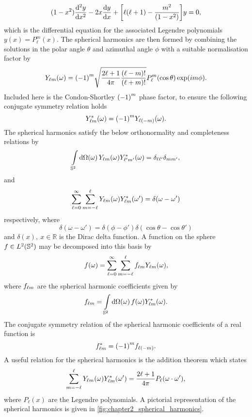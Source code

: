 %
\begin{equation}
	(1-x^{2}) \dv[2]{y}{x} - 2x\dv{y}{x} + \bigg[\ell(\ell+1) - \frac{m^{2}}{(1 - x^{2})}\bigg] y
	= 0,
\end{equation}
%
which is the differential equation for the associated Legendre polynomials \(y(x) = P^{m}_{\ell}(x)\).
The spherical harmonics are then formed by combining the solutions in the polar angle \(\theta{}\) and azimuthal angle \(\phi{}\) with a suitable normalisation factor by
%
\begin{equation}
	\pixel{\harmonic{Y}}
	= \phaseFactor \sqrt{\factor \frac{(\ell-m)!}{(\ell+m)!}} P^{m}_{\ell}(\cos{\theta}) \exp(i m\phi).
\end{equation}
%
Included here is the Condon-Shortley \(\phaseFactor{}\) phase factor, to ensure the following conjugate symmetry relation holds
%
\begin{equation}
	\pixel{\conj{\harmonic{Y}}}
	= \phaseFactor \pixel{Y_{\ell(-m)}}.
\end{equation}
%
The spherical harmonics satisfy the below orthonormality and completeness relations by
%
\begin{equation}\label{eq:chapter2_spherical_harmonics_ortho}
	\integrateSphere{\omega} \pixel{\harmonic{Y}} \pixel{\conj{\harmonic[']{Y}}}
	= \delta_{\ell\ell'} \delta_{mm'},
\end{equation}
%
and
%
\begin{equation}
	\sum\limits_{\ell=0}^{\infty} \sum\limits_{m=-\ell}^{\ell} \pixel{\harmonic{Y}} \pixel[']{\conj{\harmonic{Y}}}
	= \delta(\omega-\omega')
\end{equation}
%
respectively, where
%
\begin{equation}
	\delta(\omega-\omega')
	= \delta(\phi-\phi') \delta(\cos{\theta} - \cos{\theta'})
\end{equation}
%
and \(\delta(x),\ x \in \mathbb{R}\) is the Dirac delta function.
A function on the sphere \(f \in \hilbert{\twoSphere}\) may be decomposed into this basis by
%
\begin{equation}
	\pixel{f}
	= \sum\limits_{\ell=0}^{\infty} \sum\limits_{m=-\ell}^{\ell} \harmonic{f} \pixel{\harmonic{Y}},
\end{equation}
%
where \(\harmonic{f}\) are the spherical harmonic coefficients given by
%
\begin{equation}
	\harmonic{f}
	= \integrateSphere{\omega} \pixel{f} \pixel{\conj{\harmonic{Y}}}.
\end{equation}
%
The conjugate symmetry relation of the spherical harmonic coefficients of a real function is
%
\begin{equation}
	\conj{\harmonic{f}}
	= \phaseFactor f_{\ell(-m)}.
\end{equation}
%
A useful relation for the spherical harmonics is the addition theorem which states
%
\begin{equation}\label{eq:chapter2_addition_theorem}
	\sum\limits_{m=-\ell}^{\ell} \pixel{\harmonic{Y}} \pixel[']{\conj{\harmonic{Y}}}
	= \factor P_{\ell}(\omega \cdot \omega'),
\end{equation}
%
where \(P_{\ell}(x)\) are the Legendre polynomials.
A pictorial representation of the spherical harmonics is given in \cref{fig:chapter2_spherical_harmonics}.

